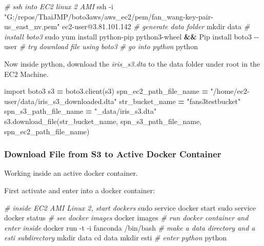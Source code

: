 \documentclass[
]{book}
\newenvironment{Shaded}{\begin{snugshade}}{\end{snugshade}}
\newcommand{\BuiltInTok}[1]{#1}
\newcommand{\CommentTok}[1]{\textcolor[rgb]{0.56,0.35,0.01}{\textit{#1}}}
\newcommand{\ExtensionTok}[1]{#1}
\newcommand{\FunctionTok}[1]{\textcolor[rgb]{0.00,0.00,0.00}{#1}}
\newcommand{\ImportTok}[1]{#1}
\newcommand{\KeywordTok}[1]{\textcolor[rgb]{0.13,0.29,0.53}{\textbf{#1}}}
\newcommand{\NormalTok}[1]{#1}
\newcommand{\OperatorTok}[1]{\textcolor[rgb]{0.81,0.36,0.00}{\textbf{#1}}}
\newcommand{\StringTok}[1]{\textcolor[rgb]{0.31,0.60,0.02}{#1}}
\begin{document}
\begin{Shaded}
\begin{Highlighting}[]
\CommentTok{\# ssh into EC2 linux 2 AMI}
\FunctionTok{ssh}\NormalTok{ {-}i }\StringTok{"G:/repos/ThaiJMP/boto3aws/aws\_ec2/pem/fan\_wang{-}key{-}pair{-}us\_east\_nv.pem"}\NormalTok{ ec2{-}user@3.81.101.142}
\CommentTok{\# generate data folder}
\FunctionTok{mkdir}\NormalTok{ data}
\CommentTok{\# install boto3}
\FunctionTok{sudo}\NormalTok{ yum install python{-}pip python3{-}wheel }\KeywordTok{\&\&} \ExtensionTok{Pip}\NormalTok{ install boto3 {-}{-}user}
\CommentTok{\# try download file using boto3}
\CommentTok{\# go into python}
\ExtensionTok{python}
\end{Highlighting}
\end{Shaded}

Now inside python, download the \emph{iris\_s3.dta} to the data folder under root in the EC2 Machine.

\begin{Shaded}
\begin{Highlighting}[]
\ImportTok{import}\NormalTok{ boto3}
\NormalTok{s3 }\OperatorTok{=}\NormalTok{ boto3.client(}\StringTok{\textquotesingle{}s3\textquotesingle{}}\NormalTok{)}
\NormalTok{spn\_ec2\_path\_file\_name }\OperatorTok{=} \StringTok{"/home/ec2{-}user/data/iris\_s3\_downloaded.dta"}
\NormalTok{str\_bucket\_name }\OperatorTok{=} \StringTok{"fans3testbucket"}
\NormalTok{spn\_s3\_path\_file\_name }\OperatorTok{=} \StringTok{"\_data/iris\_s3.dta"}
\NormalTok{s3.download\_file(str\_bucket\_name, spn\_s3\_path\_file\_name, spn\_ec2\_path\_file\_name)}
\end{Highlighting}
\end{Shaded}

\hypertarget{download-file-from-s3-to-active-docker-container}{%
\subsubsection{Download File from S3 to Active Docker Container}\label{download-file-from-s3-to-active-docker-container}}

Working inside an active docker container.

First activate and enter into a docker container:

\begin{Shaded}
\begin{Highlighting}[]
\CommentTok{\# inside EC2 AMI Linux 2, start dockers}
\FunctionTok{sudo}\NormalTok{ service docker start}
\FunctionTok{sudo}\NormalTok{ service docker status}
\CommentTok{\# see docker images}
\ExtensionTok{docker}\NormalTok{ images}
\CommentTok{\# run docker container and enter inside}
\ExtensionTok{docker}\NormalTok{ run {-}t {-}i fanconda /bin/bash}
\CommentTok{\# make a data directory and a esti subdirectory}
\FunctionTok{mkdir}\NormalTok{ data}
\BuiltInTok{cd}\NormalTok{ data}
\FunctionTok{mkdir}\NormalTok{ esti}
\CommentTok{\# enter python}
\ExtensionTok{python}
\end{Highlighting}
\end{Shaded}
\end{document}
